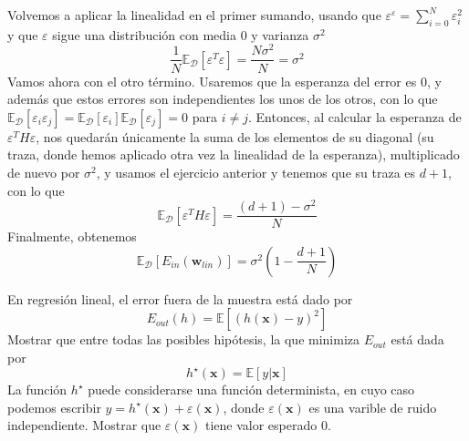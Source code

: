 \documentclass[11pt,leqno]{article}
\theoremstyle{definition}
\begin{document}
\begin{solucion}
\begin{enumerate}[a]
	Volvemos a aplicar la linealidad en el primer sumando, usando que $\varepsilon^\varepsilon = \sum_{i=0}^{N} \varepsilon_i^2$ y que $\varepsilon$ sigue una distribución con media $0$ y varianza $\sigma^2$
	\[\frac{1}{N}\mathbb{E}_\mathcal{D} [\varepsilon^T\varepsilon] = \frac{N\sigma^2}{N} = \sigma^2\]
	Vamos ahora con el otro término. Usaremos que la esperanza del error es $0$, y además que estos errores son independientes los unos de los otros, con lo que $\mathbb{E}_\mathcal{D}[\varepsilon_i \varepsilon_j] = \mathbb{E}_\mathcal{D}[\varepsilon_i]\mathbb{E}_\mathcal{D}[\varepsilon_j] = 0$ para $i\neq j$. Entonces, al calcular la esperanza de $\varepsilon^T H \varepsilon$, nos quedarán únicamente la suma de los elementos de su diagonal (su traza, donde hemos aplicado otra vez la linealidad de la esperanza), multiplicado de nuevo por $\sigma^2$, y usamos el ejercicio anterior y tenemos que su traza es $d+1$, con lo que 
	\[\mathbb{E}_\mathcal{D} [\varepsilon^T H \varepsilon]=
	\frac{(d+1)-\sigma^2}{N}
	\]
	Finalmente, obtenemos
	\[ \mathbb{E}_\mathcal{D} [E_{in}(\mathbf{w}_{lin})] =
	\sigma^2 ( 1- \frac{d+1}{N} ) \]

\end{enumerate}
\end{solucion}



\begin{cuestion}
En regresión lineal, el error fuera de la muestra está dado por
	\[ E_{out}(h) = \mathbb{E}[ (h(\mathbf{x}) - y)^2 ] \]
Mostrar que entre todas las posibles hipótesis, la que minimiza $E_{out}$ está dada por
	\[ h^\star(\mathbf{x}) = \mathbb{E}[y | \mathbf{x} ] \]
La función $h^\star$ puede considerarse una función  determinista, en cuyo caso podemos escribir $y = h^\star(\mathbf{x}) + \varepsilon(\mathbf{x})$, donde $\varepsilon(\mathbf{x})$ es una varible de ruido independiente. Mostrar que $\varepsilon(\mathbf{x})$ tiene valor esperado $0$.
\end{cuestion}

\begin{solucion}
\end{solucion}

\end{document}
